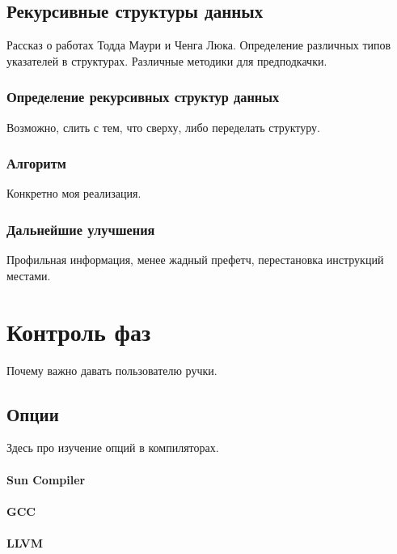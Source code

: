 \documentclass[12pt,a4paper]{article}
\begin{document}
\subsection{Рекурсивные структуры данных}

Рассказ о работах Тодда Маури и Ченга Люка. Определение различных типов указателей в структурах. Различные методики для предподкачки.

\subsubsection{Определение рекурсивных структур данных}

Возможно, слить с тем, что сверху, либо переделать структуру.

\subsubsection{Алгоритм}

Конкретно моя реализация.

\subsubsection{Дальнейшие улучшения}

Профильная информация, менее жадный префетч, перестановка инструкций местами.

\section{Контроль фаз}

Почему важно давать пользователю ручки.

\subsection{Опции}

Здесь про изучение опций в компиляторах.

\paragraph{Sun Compiler}

\paragraph{GCC}

\paragraph{LLVM}
\end{document}
